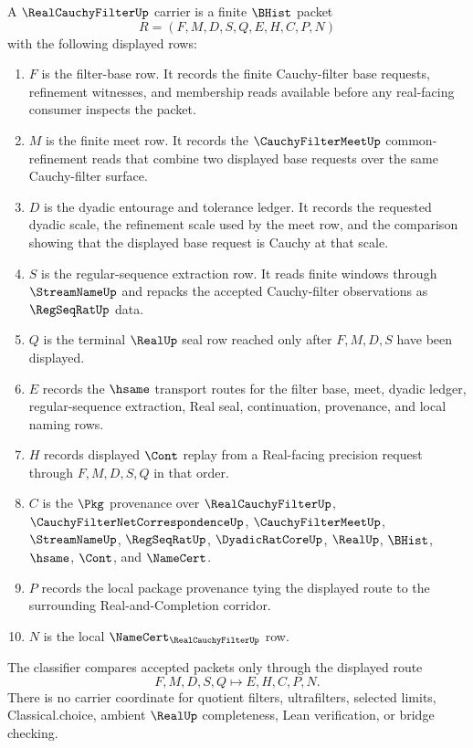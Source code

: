 \begin{definition}
\label{def:real-cauchy-filter-carrier}
A $\RealCauchyFilterUp$ carrier is a finite $\BHist$ packet
$$
R=(F,M,D,S,Q,E,H,C,P,N)
$$
with the following displayed rows:
\begin{enumerate}
\item $F$ is the filter-base row. It records the finite Cauchy-filter base requests, refinement witnesses, and membership reads available before any real-facing consumer inspects the packet.
\item $M$ is the finite meet row. It records the $\CauchyFilterMeetUp$ common-refinement reads that combine two displayed base requests over the same Cauchy-filter surface.
\item $D$ is the dyadic entourage and tolerance ledger. It records the requested dyadic scale, the refinement scale used by the meet row, and the comparison showing that the displayed base request is Cauchy at that scale.
\item $S$ is the regular-sequence extraction row. It reads finite windows through $\StreamNameUp$ and repacks the accepted Cauchy-filter observations as $\RegSeqRatUp$ data.
\item $Q$ is the terminal $\RealUp$ seal row reached only after $F,M,D,S$ have been displayed.
\item $E$ records the $\hsame$ transport routes for the filter base, meet, dyadic ledger, regular-sequence extraction, Real seal, continuation, provenance, and local naming rows.
\item $H$ records displayed $\Cont$ replay from a Real-facing precision request through $F,M,D,S,Q$ in that order.
\item $C$ is the $\Pkg$ provenance over $\RealCauchyFilterUp$, $\CauchyFilterNetCorrespondenceUp$, $\CauchyFilterMeetUp$, $\StreamNameUp$, $\RegSeqRatUp$, $\DyadicRatCoreUp$, $\RealUp$, $\BHist$, $\hsame$, $\Cont$, and $\NameCert$.
\item $P$ records the local package provenance tying the displayed route to the surrounding Real-and-Completion corridor.
\item $N$ is the local $\NameCert_{\RealCauchyFilterUp}$ row.
\end{enumerate}
The classifier compares accepted packets only through the displayed route
$$
F,M,D,S,Q \longmapsto E,H,C,P,N .
$$
There is no carrier coordinate for quotient filters, ultrafilters, selected limits, Classical.choice, ambient $\RealUp$ completeness, Lean verification, or bridge checking.
\end{definition}

